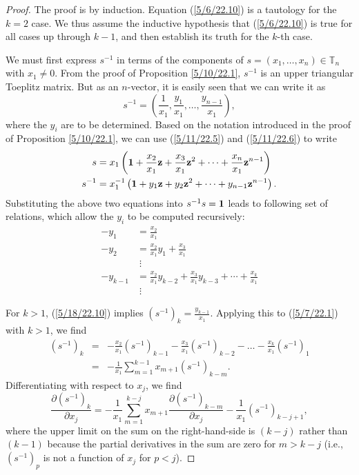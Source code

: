 \documentclass{amsart}
\numberwithin{equation}{section}
\theoremstyle{definition}
\numberwithin{theorem}{section}
\begin{document}
\begin{proof} The proof is by induction. Equation (\ref{5/6/22.10}) is a tautology for the $k=2$ case.  We thus assume the inductive hypothesis that (\ref{5/6/22.10}) is true  for all cases up through $k-1$, and then establish its truth for the $k$-th case.

\enlargethispage{3cm}
We must first express $s^{-1}$ in terms of the components of  $s=(x_1,\dots,x_n)\in \mathbb{T}_n$ with $x_1\ne 0$.   From the proof of Proposition \ref{5/10/22.1},  $s^{-1}$ is an upper triangular Toeplitz matrix.  But as an $n$-vector, it is easily seen that we can write it as  \begin{equation}\label{5/9/22.1} s^{-1} = (\frac{1}{x_1}, \frac{y_1}{x_1},\dots, \frac{y_{n-1}}{x_1}),\end{equation} where the $y_i$ are to be determined. 
Based on the notation introduced in the proof of Proposition \ref{5/10/22.1}, we can use (\ref{5/11/22.5}) and (\ref{5/11/22.6}) to write 
\begin{align}\nonumber s &= x_1 \left({\bf 1} + \frac{x_2}{x_1} {\bf z} + \frac{x_3}{x_1} {\bf z}^2 + \cdots + \frac{x_n}{x_1} {\bf z}^{n-1}\right)\\ s^{-1} &= x_1^{-1} \left({\bf 1} + y_1 {\bf z} + y_2 {\bf z}^2 + \cdots + y_{n-1} {\bf z}^{n-1}\right).  \label{5/18/22.10} \end{align}  Substituting the above two equations into $s^{-1} s = {\bf 1}$ leads to following set of relations, which allow the $y_i$ to be computed recursively:
\begin{align} -y_1 &= \frac{x_2}{x_1} \nonumber \\ -y_2 &= \frac{x_2}{x_1}y_1 + \frac{x_3}{x_1} \nonumber \\ &\;\vdots \nonumber \\ -y_{k-1} &= \frac{x_2}{x_1} y_{k-2} + \frac{x_3}{x_1} y_{k-3} + \cdots + \frac{x_k}{x_1} \label{5/7/22.1} \\ &\;\vdots \nonumber \end{align} 
 
 \noindent For $k>1$, (\ref{5/18/22.10}) implies  $\left( s^{-1} \right)_k = \frac{y_{k-1}}{x_1}$.  Applying this to (\ref{5/7/22.1}) with $k>1$, we find
\begin{eqnarray} \nonumber \left( s^{-1} \right)_k &=& -\frac{x_2}{x_1}\left( s^{-1} \right)_{k-1} - \frac{x_3}{x_1}\left( s^{-1} \right)_{k-2} -\dots  - \frac{x_k}{x_1}\left( s^{-1} \right)_1 \\ &=& -\frac{1}{x_1}\sum_{m=1}^{k-1} x_{m+1}\left( s^{-1} \right)_{k-m}. \label{5/7/22.2}\end{eqnarray}
Differentiating with respect to $x_j$, we find \begin{equation}  \frac{\partial \left( s^{-1} \right)_k}{\partial x_j} = -\frac{1}{x_1} \sum_{m=1}^{k-j} x_{m+1} \frac{\partial \left( s^{-1} \right)_{k-m}}{\partial x_j} -  \frac{1}{x_1}\left( s^{-1} \right)_{k-j+1} \label{5/7/22.4}, \end{equation} where the upper limit on the sum on the right-hand-side is $(k-j)$ rather than $(k-1)$ because the partial derivatives in the sum are zero for $m> k-j$ (i.e., $\left( s^{-1} \right)_p$ is not a function of $x_j$ for $p<j$).  


\end{proof}
\end{document}
